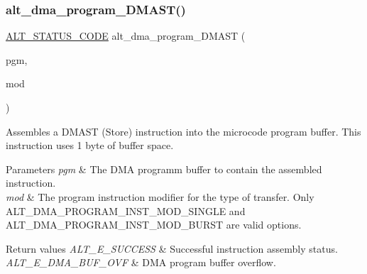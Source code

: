 \subsubsection{\texorpdfstring{alt\_dma\_program\_DMAST()}{alt\_dma\_program\_DMAST()}}
{\footnotesize\ttfamily \mbox{\hyperlink{hwlib_8h_abdb0d369f069723ca55d6c94bcaaaa12}{A\+L\+T\+\_\+\+S\+T\+A\+T\+U\+S\+\_\+\+C\+O\+DE}} alt\+\_\+dma\+\_\+program\+\_\+\+D\+M\+A\+ST (\begin{DoxyParamCaption}\item[{\mbox{\hyperlink{group__ALT__DMA__PRG_gadb7028531574894854db4db6d797de97}{A\+L\+T\+\_\+\+D\+M\+A\+\_\+\+P\+R\+O\+G\+R\+A\+M\+\_\+t}} $\ast$}]{pgm,  }\item[{\mbox{\hyperlink{group__ALT__DMA__PRG_gaf8145a0ef11f4188f07bb0c961575d4a}{A\+L\+T\+\_\+\+D\+M\+A\+\_\+\+P\+R\+O\+G\+R\+A\+M\+\_\+\+I\+N\+S\+T\+\_\+\+M\+O\+D\+\_\+t}}}]{mod }\end{DoxyParamCaption})}

Assembles a D\+M\+A\+ST (Store) instruction into the microcode program buffer. This instruction uses 1 byte of buffer space.


\begin{DoxyParams}{Parameters}
{\em pgm} & The D\+MA programm buffer to contain the assembled instruction.\\
\hline
{\em mod} & The program instruction modifier for the type of transfer. Only A\+L\+T\+\_\+\+D\+M\+A\+\_\+\+P\+R\+O\+G\+R\+A\+M\+\_\+\+I\+N\+S\+T\+\_\+\+M\+O\+D\+\_\+\+S\+I\+N\+G\+LE and A\+L\+T\+\_\+\+D\+M\+A\+\_\+\+P\+R\+O\+G\+R\+A\+M\+\_\+\+I\+N\+S\+T\+\_\+\+M\+O\+D\+\_\+\+B\+U\+R\+ST are valid options.\\
\hline
\end{DoxyParams}

\begin{DoxyRetVals}{Return values}
{\em A\+L\+T\+\_\+\+E\+\_\+\+S\+U\+C\+C\+E\+SS} & Successful instruction assembly status. \\
\hline
{\em A\+L\+T\+\_\+\+E\+\_\+\+D\+M\+A\+\_\+\+B\+U\+F\+\_\+\+O\+VF} & D\+MA program buffer overflow. \\
\hline
\end{DoxyRetVals}
\mbox{\label{group__ALT__DMA__PRG_ga97b73fb7c54dd21f84b85c3b63313982}} 
